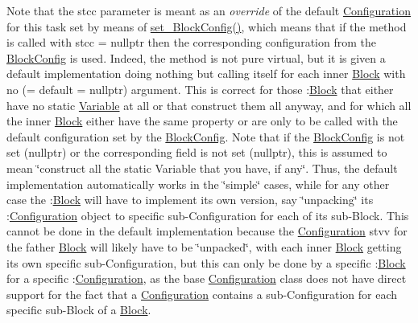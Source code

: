 Note that the stcc parameter is meant as an {\itshape override} of the default \mbox{\hyperlink{class_s_m_spp__di__unipi__it_1_1_configuration}{Configuration}} for this task set by means of \mbox{\hyperlink{class_s_m_spp__di__unipi__it_1_1_block_a18d411b740a47db00d15083c5c7ef2ba}{set\+\_\+\+Block\+Config()}}, which means that if the method is called with stcc = nullptr then the corresponding configuration from the \mbox{\hyperlink{class_s_m_spp__di__unipi__it_1_1_block_config}{Block\+Config}} is used. Indeed, the method is not pure virtual, but it is given a default implementation doing nothing but calling itself for each inner \mbox{\hyperlink{class_s_m_spp__di__unipi__it_1_1_block}{Block}} with no (= default = nullptr) argument. This is correct for those \+:\mbox{\hyperlink{class_s_m_spp__di__unipi__it_1_1_block}{Block}} that either have no static \mbox{\hyperlink{class_s_m_spp__di__unipi__it_1_1_variable}{Variable}} at all or that construct them all anyway, and for which all the inner \mbox{\hyperlink{class_s_m_spp__di__unipi__it_1_1_block}{Block}} either have the same property or are only to be called with the default configuration set by the \mbox{\hyperlink{class_s_m_spp__di__unipi__it_1_1_block_config}{Block\+Config}}. Note that if the \mbox{\hyperlink{class_s_m_spp__di__unipi__it_1_1_block_config}{Block\+Config}} is not set (nullptr) or the corresponding field is not set (nullptr), this is assumed to mean \char`\"{}construct all the static Variable
that you have, if any\char`\"{}. Thus, the default implementation automatically works in the \char`\"{}simple\char`\"{} cases, while for any other case the \+:\mbox{\hyperlink{class_s_m_spp__di__unipi__it_1_1_block}{Block}} will have to implement its own version, say \char`\"{}unpacking\char`\"{} its \+:\mbox{\hyperlink{class_s_m_spp__di__unipi__it_1_1_configuration}{Configuration}} object to specific sub-\/\+Configuration for each of its sub-\/\+Block. This cannot be done in the default implementation because the \mbox{\hyperlink{class_s_m_spp__di__unipi__it_1_1_configuration}{Configuration}} stvv for the father \mbox{\hyperlink{class_s_m_spp__di__unipi__it_1_1_block}{Block}} will likely have to be \char`\"{}unpacked\char`\"{}, with each inner \mbox{\hyperlink{class_s_m_spp__di__unipi__it_1_1_block}{Block}} getting its own specific sub-\/\+Configuration, but this can only be done by a specific \+:\mbox{\hyperlink{class_s_m_spp__di__unipi__it_1_1_block}{Block}} for a specific \+:\mbox{\hyperlink{class_s_m_spp__di__unipi__it_1_1_configuration}{Configuration}}, as the base \mbox{\hyperlink{class_s_m_spp__di__unipi__it_1_1_configuration}{Configuration}} class does not have direct support for the fact that a \mbox{\hyperlink{class_s_m_spp__di__unipi__it_1_1_configuration}{Configuration}} contains a sub-\/\+Configuration for each specific sub-\/\+Block of a \mbox{\hyperlink{class_s_m_spp__di__unipi__it_1_1_block}{Block}}. 

